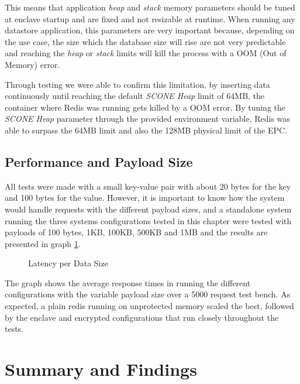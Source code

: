 This means that application \textit{heap} and \textit{stack} memory parameters should be tuned at enclave startup and are fixed and not resizable at runtime. When running any datastore application, this parameters are very important because, depending on the use case, the size which the database size will rise are not very predictable and reaching the \textit{heap} or \textit{stack} limits will kill the process with a \gls{OOM} (Out of Memory) error.

Through testing we were able to confirm this limitation, by inserting data continuously until reaching the default \textit{SCONE Heap} limit of 64\gls{MB}, the container where Redis was running gets killed by a \gls{OOM} error. By tuning the \textit{SCONE Heap} parameter through the provided environment variable, Redis was able to surpass the 64\gls{MB} limit and also the 128\gls{MB} physical limit of the \gls{EPC}.

\subsection{Performance and Payload Size}
\label{ssec:performance_and_payload_size}

All tests were made with a small key-value pair with about 20 bytes for the key and 100 bytes for the value. However, it is important to know how the system would handle requests with the different payload sizes, and a standalone system running the three systems configurations tested in this chapter were tested with payloads of 100 bytes, 1KB, 100KB, 500KB and 1MB and the results are presented in graph \ref{fig:latency_per_data_size}.

\begin{figure}[htbp]
  \caption{Latency per Data Size}
  \label{fig:latency_per_data_size}
\end{figure}

The graph shows the average response times in running the different configurations with the variable payload size over a 5000 request test bench. As expected, a plain redis running on unprotected memory scaled the best, followed by the enclave and encrypted configurations that run closely throughout the tests.

\section{ Summary and Findings}
\label{sec:summary_and_findings}

